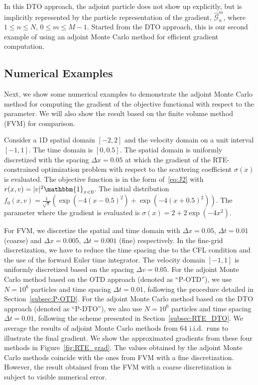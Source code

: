 \documentclass[12pt]{amsart}
\begin{document}
In this DTO approach, the adjoint particle does  not show up explicitly, but is implicitly represented by the particle representation of the gradient, $\widehat{\mathcal{G}}_n^m$, where $1\leq n\leq N$, $0\leq m \leq M-1$. Started from the DTO approach, this is our second example of using an adjoint Monte Carlo method for efficient gradient computation.


\subsection{Numerical Examples}
Next, we show some numerical examples to demonstrate the adjoint Monte Carlo method for computing the gradient of the objective functional with respect to the parameter. We will also show the result based on the finite volume method (FVM) for comparison.

Consider a 1D spatial domain $[-2,2]$ and the velocity domain on a unit interval $[-1,1]$. The time domain is $[0,0.5]$. The spatial domain is uniformly discretized with the spacing $\Delta x = 0.05$ at which the gradient of the RTE-constrained optimization problem with respect to the scattering coefficient $\sigma(x)$ is evaluated. The objective function is in the form of~\eqref{eq:J2} with $r(x,v) = |v|^2 \mathbbm{1}_{x<0}$. The initial distribution $f_0(x,v) = \frac{1}{\sqrt{\pi}}\left(\exp(-4(x-0.5)^2) + \exp(-4(x+0.5)^2) \right)$.   The parameter where the gradient is evaluated is $\sigma(x) = 2+2\exp(-4x^2)$. 

For FVM, we discretize the spatial and time domain with $\Delta x = 0.05$, $\Delta t = 0.01$ (coarse) and  $\Delta x = 0.005$, $\Delta t = 0.001$ (fine) respectively. In the fine-grid discretization, we have to reduce the time spacing due to the CFL condition and the use of the forward Euler time integrator.  The velocity domain $[-1, 1]$ is uniformly discretized based on the spacing $\Delta v = 0.05$. For the adjoint Monte Carlo method based on the OTD approach (denoted as ``P-OTD''),  we use $N = 10^6$ particles and time spacing $\Delta t = 0.01$, following the procedure detailed in Section~\ref{subsec:P-OTD}. 
For the adjoint Monte Carlo method based on the DTO approach (denoted as ``P-DTO''),  we also use $N = 10^6$ particles and time spacing $\Delta t = 0.01$, following the scheme presented in Section~\ref{subsec:RTE_DTO}.  We average the results of adjoint Monte Carlo methods from $64$ i.i.d.~runs to illustrate the final gradient.   We show the approximated gradients from these four methods in Figure~\ref{fig:RTE_grad}.  The values obtained by the adjoint Monte Carlo methods coincide with the ones from FVM with a fine discretization. However, the result obtained from the FVM with a coarse discretization is subject to visible numerical error.
\end{document}
